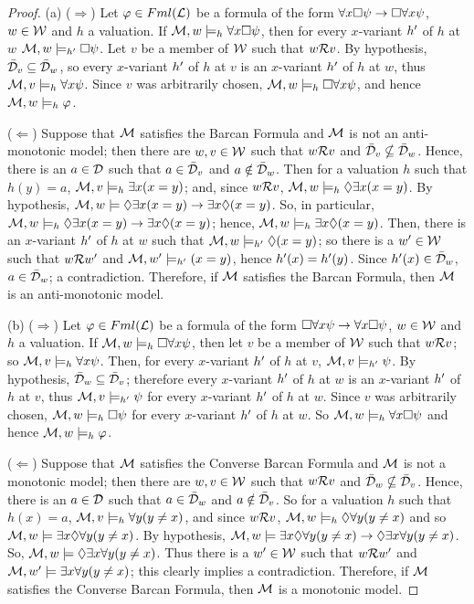 \begin{proof}
(a) ($\Rightarrow$) Let $\varphi \in Fml(\mathcal{L})$ be a formula of the form $\forall x \Box \psi \rightarrow \Box \forall x\psi$, $w \in \mathcal{W}$ and $h$ a valuation. If $\mathcal{M},w \models_{h} \forall x \Box \psi$, then for every $x$-variant $h^{\prime}$ of $h$ at $w$ $\mathcal{M},w \models_{h^{\prime}} \Box \psi$. Let $v$ be a member of $\mathcal{W}$ such that $w\mathcal{R} v$. By hypothesis, $\bar{\mathcal{D}}_{v} \subseteq \bar{\mathcal{D}}_{w}$, so every $x$-variant $h^{\prime}$ of $h$ at $v$ is an $x$-variant $h^{\prime}$ of $h$ at $w$, thus $\mathcal{M},v \models_{h} \forall x\psi$. Since $v$ was arbitrarily chosen, $\mathcal{M},w \models_{h} \Box \forall x \psi$, and hence $\mathcal{M},w \models_{h} \varphi$.

\qquad ($\Leftarrow$) Suppose that $\mathcal{M}$ satisfies the Barcan Formula and 
$\mathcal{M}$ is not an anti-monotonic model; then there are $w,v \in \mathcal{W}$ such that $w\mathcal{R} v$ and $\bar{\mathcal{D}}_{v} \nsubseteq \bar{\mathcal{D}}_{w}$. Hence, there is an $a \in \mathcal{D}$ such that $a \in \bar{\mathcal{D}}_{v}$ and $a \notin \bar{\mathcal{D}}_{w}$. Then for a valuation $h$ such that $h(y) = a$, $\mathcal{M},v \models_{h} \exists x (x =y)$; and, since $w\mathcal{R} v$, $\mathcal{M},w \models_{h} \Diamond \exists x (x =y)$.  By hypothesis, $\mathcal{M},w \models \Diamond \exists x (x=y) \rightarrow \exists x \Diamond (x =y)$. So, in particular, $\mathcal{M},w \models_{h} \Diamond \exists x (x=y) \rightarrow \exists x \Diamond (x =y)$; hence, $\mathcal{M},w \models_{h} \exists x \Diamond (x =y)$. Then, there is an $x$-variant $h^{\prime}$ of $h$ at $w$ such that $\mathcal{M},w \models_{h^{\prime}} \Diamond (x =y)$; so there is a $w^{\prime} \in \mathcal{W}$ such that $w\mathcal{R} w^{\prime}$ and $\mathcal{M},w^{\prime} \models_{h^{\prime}} (x=y)$, hence $h^{\prime}(x) =h^{\prime}(y)$. Since $h^{\prime}(x) \in \bar{\mathcal{D}}_{w}$, $a \in \bar{\mathcal{D}}_{w}$; a contradiction. Therefore, if $\mathcal{M}$ satisfies the Barcan Formula, then $\mathcal{M}$ is an anti-monotonic model.       

\qquad (b) ($\Rightarrow$) Let $\varphi \in Fml(\mathcal{L})$ be a formula of the form $\Box \forall x\psi \rightarrow \forall x \Box \psi$, $w \in \mathcal{W}$ and $h$ a valuation. If $\mathcal{M},w \models_{h} \Box \forall x\psi$, then let $v$ be a member of $\mathcal{W}$ such that $w\mathcal{R} v$; so $\mathcal{M},v \models_{h} \forall x\psi$. Then, for every  $x$-variant $h^{\prime}$ of $h$ at $v$, $\mathcal{M},v \models_{h^{\prime}} \psi$. By hypothesis, $\bar{\mathcal{D}}_{w} \subseteq \bar{\mathcal{D}}_{v}$; therefore every $x$-variant $h^{\prime}$ of $h$ at $w$ is an $x$-variant $h^{\prime}$ of $h$ at $v$, thus $\mathcal{M},v \models_{h^{\prime}} \psi$ for every $x$-variant $h^{\prime}$ of $h$ at $w$. Since $v$ was arbitrarily chosen, $\mathcal{M},w \models_{h} \Box \psi$ for every $x$-variant $h^{\prime}$ of $h$ at $w$. So $\mathcal{M},w \models_{h} \forall x \Box \psi$ and hence $\mathcal{M},w \models_{h} \varphi$.   

\qquad ($\Leftarrow$) Suppose that $\mathcal{M}$ satisfies the Converse Barcan Formula and $\mathcal{M}$ is not a monotonic model; then there are $w,v \in \mathcal{W}$ such that $w\mathcal{R} v$ and $\bar{\mathcal{D}}_{w} \nsubseteq \bar{\mathcal{D}}_{v}$. Hence, there is an $a \in \mathcal{D}$ such that $a \in \bar{\mathcal{D}}_{w}$ and $a \notin \bar{\mathcal{D}}_{v}$. So for a valuation $h$ such that $h(x)=a$, $\mathcal{M},v \models_{h} \forall y (y \neq x)$, and since $w\mathcal{R} v$, $\mathcal{M},w \models_{h} \Diamond \forall y (y\neq x)$ and so $\mathcal{M},w \models \exists x \Diamond \forall y (y\neq x)$. By hypothesis, $\mathcal{M},w\models \exists x \Diamond \forall y (y\neq x) \rightarrow \Diamond \exists x \forall y (y\neq x)$. So,  $\mathcal{M},w\models \Diamond \exists x \forall y (y\neq x)$. Thus there is a $w^{\prime} \in \mathcal{W}$ such that $w\mathcal{R} w^{\prime}$ and $\mathcal{M},w^{\prime} \models \exists x \forall y (y\neq x)$; this clearly implies a contradiction. Therefore, if $\mathcal{M}$ satisfies the Converse Barcan Formula, then $\mathcal{M}$ is a monotonic model.   


\end{proof}
